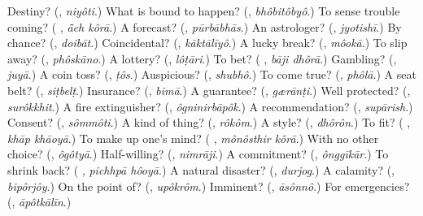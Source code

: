 \begin{tcolorbox}[breakable,colback=teal!4,colframe=teal!35!black,title={Before you move on}]
Destiny? (\textbf{}, \emph{niyôti}.) What is bound to happen? (\textbf{}, \emph{bhôbitôbyô}.) To sense trouble coming? (\textbf{ }, \emph{ā̃ch kôrā}.) A forecast? (\textbf{}, \emph{pūrbābhās}.) An astrologer? (\textbf{}, \emph{jyotishī}.) By chance? (\textbf{}, \emph{doibāt}.) Coincidental? (\textbf{}, \emph{kāktālīyô}.) A lucky break? (\textbf{}, \emph{môokā}.) To slip away? (\textbf{}, \emph{phôskāno}.) A lottery? (\textbf{}, \emph{lôṭāri}.) To bet? (\textbf{ }, \emph{bāji dhôrā}.) Gambling? (\textbf{}, \emph{juyā}.) A coin toss? (\textbf{}, \emph{ṭôs}.) Auspicious? (\textbf{}, \emph{shubhô}.) To come true? (\textbf{}, \emph{phôlā}.) A seat belt? (\textbf{}, \emph{siṭbelṭ}.) Insurance? (\textbf{}, \emph{bimā}.) A guarantee? (\textbf{}, \emph{gærānṭi}.) Well protected? (\textbf{}, \emph{surôkkhit}.) A fire extinguisher? (\textbf{}, \emph{ôgninirbāpôk}.) A recommendation? (\textbf{}, \emph{supārish}.) Consent? (\textbf{}, \emph{sômmôti}.) A kind of thing? (\textbf{}, \emph{rôkôm}.) A style? (\textbf{}, \emph{dhôrôn}.) To fit? (\textbf{ }, \emph{khāp khāoyā}.) To make up one's mind? (\textbf{ }, \emph{mônôsthir kôrā}.) With no other choice? (\textbf{}, \emph{ôgôtyā}.) Half-willing? (\textbf{}, \emph{nimrāji}.) A commitment? (\textbf{}, \emph{ônggīkār}.) To shrink back? (\textbf{ }, \emph{pichhpā hôoyā}.) A natural disaster? (\textbf{}, \emph{durjog}.) A calamity? (\textbf{}, \emph{bipôrjôy}.) On the point of? (\textbf{}, \emph{upôkrôm}.) Imminent? (\textbf{}, \emph{āsônnô}.) For emergencies? (\textbf{}, \emph{āpôtkālīn}.)
\end{tcolorbox}
